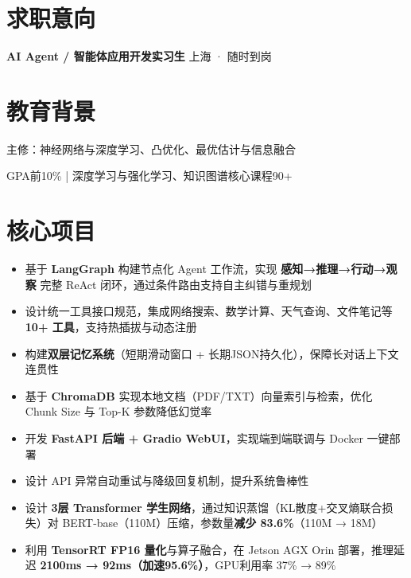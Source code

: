 \documentclass{resume}
\begin{document}

\section{求职意向}
\vspace{-4pt}
\textbf{AI Agent / 智能体应用开发实习生} \hfill 上海 · 随时到岗

\section{教育背景}
主修：神经网络与深度学习、凸优化、最优估计与信息融合

GPA前10\% | 深度学习与强化学习、知识图谱核心课程90+

\section{核心项目}
\begin{itemize}
  \item 基于 \textbf{LangGraph} 构建节点化 Agent 工作流，实现 \textbf{感知→推理→行动→观察} 完整 ReAct 闭环，通过条件路由支持自主纠错与重规划
  \item 设计统一工具接口规范，集成网络搜索、数学计算、天气查询、文件笔记等 \textbf{10+ 工具}，支持热插拔与动态注册
  \item 构建\textbf{双层记忆系统}（短期滑动窗口 + 长期JSON持久化），保障长对话上下文连贯性
  \item 基于 \textbf{ChromaDB} 实现本地文档（PDF/TXT）向量索引与检索，优化 Chunk Size 与 Top-K 参数降低幻觉率
  \item 开发 \textbf{FastAPI 后端 + Gradio WebUI}，实现端到端联调与 Docker 一键部署
  \item 设计 API 异常自动重试与降级回复机制，提升系统鲁棒性
\end{itemize}

\begin{itemize}
  \item 设计 \textbf{3层 Transformer 学生网络}，通过知识蒸馏（KL散度+交叉熵联合损失）对 BERT-base（110M）压缩，参数量\textbf{减少 83.6\%}（110M → 18M）
  \item 利用 \textbf{TensorRT FP16 量化}与算子融合，在 Jetson AGX Orin 部署，推理延迟 \textbf{2100ms → 92ms（加速95.6\%）}，GPU利用率 37\% → 89\%
\end{itemize}
\end{document}

